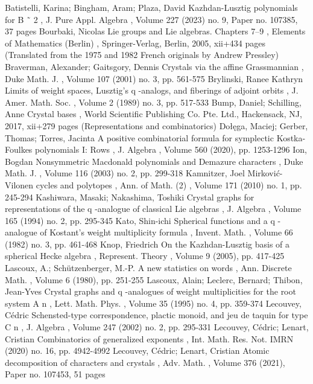  Batistelli, Karina; Bingham, Aram; Plaza, David Kazhdan-Lusztig polynomials for B ˜ 2 , J. Pure Appl. Algebra , Volume 227 (2023) no. 9, Paper no. 107385, 37 pages
 Bourbaki, Nicolas Lie groups and Lie algebras. Chapters 7–9 , Elements of Mathematics (Berlin) , Springer-Verlag, Berlin, 2005, xii+434 pages (Translated from the 1975 and 1982 French originals by Andrew Pressley)
 Braverman, Alexander; Gaitsgory, Dennis Crystals via the affine Grassmannian , Duke Math. J. , Volume 107 (2001) no. 3, pp. 561-575
 Brylinski, Ranee Kathryn Limits of weight spaces, Lusztig’s q -analogs, and fiberings of adjoint orbits , J. Amer. Math. Soc. , Volume 2 (1989) no. 3, pp. 517-533
 Bump, Daniel; Schilling, Anne Crystal bases , World Scientific Publishing Co. Pte. Ltd., Hackensack, NJ, 2017, xii+279 pages (Representations and combinatorics)
 Dołęga, Maciej; Gerber, Thomas; Torres, Jacinta A positive combinatorial formula for symplectic Kostka-Foulkes polynomials I: Rows , J. Algebra , Volume 560 (2020), pp. 1253-1296
 Ion, Bogdan Nonsymmetric Macdonald polynomials and Demazure characters , Duke Math. J. , Volume 116 (2003) no. 2, pp. 299-318
 Kamnitzer, Joel Mirković-Vilonen cycles and polytopes , Ann. of Math. (2) , Volume 171 (2010) no. 1, pp. 245-294
 Kashiwara, Masaki; Nakashima, Toshiki Crystal graphs for representations of the q -analogue of classical Lie algebras , J. Algebra , Volume 165 (1994) no. 2, pp. 295-345
 Kato, Shin-ichi Spherical functions and a q -analogue of Kostant’s weight multiplicity formula , Invent. Math. , Volume 66 (1982) no. 3, pp. 461-468
 Knop, Friedrich On the Kazhdan-Lusztig basis of a spherical Hecke algebra , Represent. Theory , Volume 9 (2005), pp. 417-425
 Lascoux, A.; Schützenberger, M.-P. A new statistics on words , Ann. Discrete Math. , Volume 6 (1980), pp. 251-255
 Lascoux, Alain; Leclerc, Bernard; Thibon, Jean-Yves Crystal graphs and q -analogues of weight multiplicities for the root system A n , Lett. Math. Phys. , Volume 35 (1995) no. 4, pp. 359-374
 Lecouvey, Cédric Schensted-type correspondence, plactic monoid, and jeu de taquin for type C n , J. Algebra , Volume 247 (2002) no. 2, pp. 295-331
 Lecouvey, Cédric; Lenart, Cristian Combinatorics of generalized exponents , Int. Math. Res. Not. IMRN (2020) no. 16, pp. 4942-4992
 Lecouvey, Cédric; Lenart, Cristian Atomic decomposition of characters and crystals , Adv. Math. , Volume 376 (2021), Paper no. 107453, 51 pages
